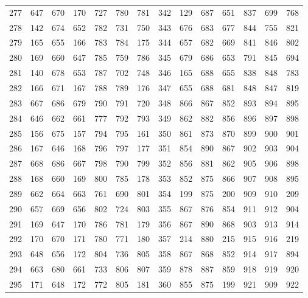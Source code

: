 \begin{apendicesenv}
\begin{table}[H]
\begin{tabular}{@{}ccccccc@{\hspace{1.0cm}}ccccccc@{}}
		277 &  647 &  670 &  170 &  727 &  780 &  781 & 342 &  129 &  687 &  651 &  837 &  699 &  768 \\
		278 &  142 &  674 &  652 &  782 &  731 &  750 & 343 &  676 &  683 &  677 &  844 &  755 &  821 \\
		279 &  165 &  655 &  166 &  783 &  784 &  175 & 344 &  657 &  682 &  669 &  841 &  846 &  802 \\
		280 &  169 &  660 &  647 &  785 &  759 &  786 & 345 &  679 &  686 &  653 &  791 &  845 &  694 \\
		281 &  140 &  678 &  653 &  787 &  702 &  748 & 346 &  165 &  688 &  655 &  838 &  848 &  783 \\
		282 &  166 &  671 &  167 &  788 &  789 &  176 & 347 &  655 &  688 &  681 &  848 &  847 &  819 \\
		283 &  667 &  686 &  679 &  790 &  791 &  720 & 348 &  866 &  867 &  852 &  893 &  894 &  895 \\
		284 &  646 &  662 &  661 &  777 &  792 &  793 & 349 &  862 &  882 &  856 &  896 &  897 &  898 \\
		285 &  156 &  675 &  157 &  794 &  795 &  161 & 350 &  861 &  873 &  870 &  899 &  900 &  901 \\
		286 &  167 &  646 &  168 &  796 &  797 &  177 & 351 &  854 &  890 &  867 &  902 &  903 &  904 \\
		287 &  668 &  686 &  667 &  798 &  790 &  799 & 352 &  856 &  881 &  862 &  905 &  906 &  898 \\
		288 &  168 &  660 &  169 &  800 &  785 &  178 & 353 &  852 &  875 &  866 &  907 &  908 &  895 \\
		289 &  662 &  664 &  663 &  761 &  690 &  801 & 354 &  199 &  875 &  200 &  909 &  910 &  209 \\
		290 &  657 &  669 &  656 &  802 &  724 &  803 & 355 &  867 &  876 &  854 &  911 &  912 &  904 \\
		291 &  169 &  647 &  170 &  786 &  781 &  179 & 356 &  867 &  890 &  868 &  903 &  913 &  914 \\
		292 &  170 &  670 &  171 &  780 &  771 &  180 & 357 &  214 &  880 &  215 &  915 &  916 &  219 \\
		293 &  648 &  656 &  172 &  804 &  736 &  805 & 358 &  867 &  868 &  852 &  914 &  917 &  894 \\
		294 &  663 &  680 &  661 &  733 &  806 &  807 & 359 &  878 &  887 &  859 &  918 &  919 &  920 \\
		295 &  171 &  648 &  172 &  772 &  805 &  181 & 360 &  855 &  875 &  199 &  921 &  909 &  922 \\

\end{tabular}
\end{table}
\end{apendicesenv}
